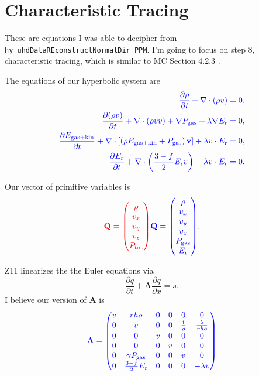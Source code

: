 \documentclass[preprint,11pt]{aastex}
\newcommand{\beq}{\begin{equation}}
\newcommand{\eeq}{\end{equation}}
\newcommand{\bea}{\begin{eqnarray}}
\newcommand{\eea}{\end{eqnarray}}
\begin{document}
\section{Characteristic Tracing}
\label{sec:characteristic}
These are equations I was able to decipher from \verb!hy_uhdDataREconstructNormalDir_PPM!.  I'm going to focus on step $8$, characteristic tracing, which is similar to MC Section 4.2.3 .

The equations of our hyperbolic system are
\bea
{\color{blue}
	\frac{\partial \rho}{\partial t} + \nabla \cdot (\rho v) = 0,
} \\
{\color{blue}
	\frac{\partial (\rho v)}{\partial t} + \nabla \cdot (\rho v v) + \nabla P_{\rm gas} + \lambda \nabla E_{\rm r} = 0,
} \\
{\color{blue}
	\frac{\partial E_{\rm gas+kin}}{\partial t} + \nabla \cdot \left[ \left( \rho E_{\rm gas+kin} + P_{\rm gas} \right) \mathbf{v} \right] + \lambda v \cdot E_{\rm r} = 0,
} \\
{\color{blue}
	\frac{\partial E_{\rm r}}{\partial t} + \nabla \cdot \left( \frac{3-f}{2} E_{\rm r} v \right) - \lambda v \cdot E_{\rm r} = 0.
}
\eea

Our vector of primitive variables is
\beq
{\color{red}\mathbf{Q} = \begin{pmatrix}\rho\\v_x \\ v_y \\ v_z \\ P_{\rm tot}\end{pmatrix}} {\color{blue}\mathbf{Q} = \begin{pmatrix}\rho\\v_x \\ v_y \\ v_z \\ P_{\rm gas} \\ E_{\rm r}\end{pmatrix}}.
\eeq

Z11 linearizes the the Euler equations via
\beq
\frac{\partial q}{\partial t} + \mathbf{A} \frac{\partial q}{\partial x} = s.
\eeq
I believe our version of $\mathbf{A}$ is
\beq
{
	\color{blue}
	\mathbf{A} = 
	\begin{pmatrix}
	v & rho & 0 & 0 & 0 & 0 \\
	0 & v & 0 & 0 & \frac{1}{\rho} & \frac{\lambda}{rho} \\
	0 & 0 & v & 0 & 0 & 0 \\
	0 & 0 & 0 & v & 0 & 0 \\
	0 & \gamma P_{\rm gas} & 0 & 0 & v & 0 \\
	0 & \frac{3-f}{2} E_{\rm r} & 0 & 0 & 0 & -\lambda v
	\end{pmatrix}
}
\eeq
\end{document}
